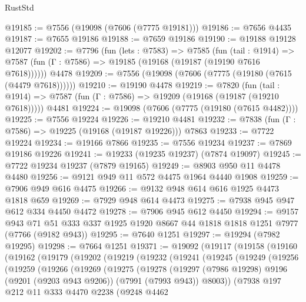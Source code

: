 \begin{lexlean}{RustStd}
\begin{coremodule}
{\begin{coremodule}
{{{{{{{{{{{{{{{{{{{{{{{{{{{{{{{{{{{{{{{{{{{@19185 := @7556 (@19098 (@7606 (@7775 @19181)))
@19186 := @7656 @4435
@19187 := @7655 @19186
@19188 := @7659 @19186
@19190 := @19188 @19128 @12077
@19202 := @7796
    (fun (lets : @7583) =>
    @7585
      (fun (tail : @1914) =>
      @7587 (fun (Γ : @7586) => @19185 (@19168 (@19187 (@19190 @7616 @7618))))))
    @4478
@19209 := @7556 (@19098 (@7606 (@7775 (@19180 (@7615 (@4479 @7618))))))
@19210 := @19190 @4478
@19219 := @7820
    (fun (tail : @1914) => @7587 (fun (Γ : @7586) => @19209 (@19168 (@19187 (@19210 @7618)))))
    @4481
@19224 := @19098 (@7606 (@7775 (@19180 (@7615 @4482))))
@19225 := @7556 @19224
@19226 := @19210 @4481
@19232 := @7838 (fun (Γ : @7586) => @19225 (@19168 (@19187 @19226))) @7863
@19233 := @7722 @19224
@19234 := @19166 @7866
@19235 := @7556 @19234
@19237 := @7869 @19186 @19226
@19241 := @19233 (@19235 @19237) (@7874 @19097)
@19245 := @7722 @19234 @19237 (@7879 @19165)
@19249 := @8903 @950 @11 @4478 @4480
@19256 := @9121 @949 @11 @572 @4475 @1964 @4440 @1908
@19259 := @7906 @949 @616 @4475
@19266 := @9132 @948 @614 @616 @1925 @4473 @1818 @659
@19269 := @7929 @948 @614 @4473
@19275 := @7938 @945 @947 @612 @334 @4450 @4472
@19278 := @7906 @945 @612 @4450
@19294 := @9157
    @943
    @71
    @51
    @333
    @337
    @1925
    @1920
    @8667
    @44
    @1818
    @1818
    @1251
    @7977
    (@7766 (@9182 @943))
@19295 := @7640 @1251
@19297 := @19294 (@7982 @19295)
@19298 := @7664 @1251
@19371 := @19092
    (@19117
      (@19158
        (@19160
          (@19162
            (@19179
              (@19202
                (@19219
                  (@19232
                    (@19241
                      (@19245
                        (@19249
                          (@19256
                            (@19259
                              (@19266
                                (@19269
                                  (@19275
                                    (@19278
                                      (@19297
                                        (@7986 @19298)
                                        @9196
                                        (@9201 (@9203 @943 @9206))
                                        (@7991 (@7993 @943))
                                        @8003))
                                    (@7938
                                      @197
                                      @212
                                      @11
                                      @333
                                      @4470
                                      @2238
                                      (@9248
                                        @4462
}}}}}}}}}}}}}}}}}}}}}}}}}}}}}}}}}}}}}}}}}}}
\end{coremodule}}
\end{coremodule}
\end{lexlean}
